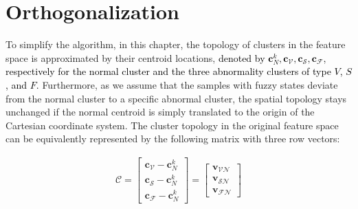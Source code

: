 
\section{Orthogonalization}

To simplify the algorithm, in this chapter, the topology of clusters in the feature space is approximated by their centroid locations, \textcolor{black}{denoted by $\mathbf{c}_N^k, \mathbf{c}_{\mathcal{V}}, \mathbf{c}_{\mathcal{S}}, \mathbf{c}_{\mathcal{F}}$, respectively for the normal cluster and the three abnormality clusters of type $V$, $S$, and $F$.} Furthermore, as we assume that the samples with fuzzy states deviate from the normal cluster to a specific abnormal cluster, the spatial topology stays unchanged if the normal centroid is simply translated to the origin of the Cartesian coordinate system. The cluster topology in the original feature space can be equivalently represented by the following matrix with three row vectors:

\begin{align}
\mathcal{C} = 
\begin{bmatrix}
\mathbf{c}_{\mathcal{V}} - \mathbf{c}_N^k \\
\mathbf{c}_{\mathcal{S}} - \mathbf{c}_N^k \\
\mathbf{c}_{\mathcal{F}} - \mathbf{c}_N^k
\end{bmatrix} = 
\begin{bmatrix}
\mathbf{v}_{\mathcal{VN}} \\
\mathbf{v}_{\mathcal{SN}} \\
\mathbf{v}_{\mathcal{FN}}
\end{bmatrix}
\end{align}


